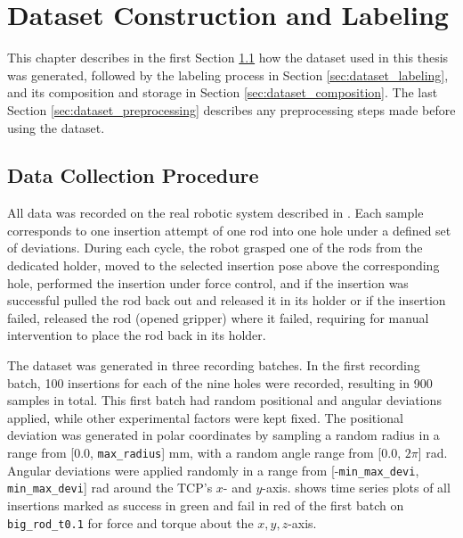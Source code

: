 \chapter{Dataset Construction and Labeling}\label{ch:dataset}

This chapter describes in the first Section \ref{sec:dataset_collection} how the dataset used in this thesis was generated, followed by the labeling process in Section \ref{sec:dataset_labeling}, and its composition and storage in Section \ref{sec:dataset_composition}. The last Section \ref{sec:dataset_preprocessing} describes any preprocessing steps made before using the dataset.

\section{Data Collection Procedure}\label{sec:dataset_collection}

All data was recorded on the real robotic system described in . Each sample corresponds to one insertion attempt of one rod into one hole under a defined set of deviations. During each cycle, the robot grasped one of the rods from the dedicated holder, moved to the selected insertion pose above the corresponding hole, performed the insertion under force control, and if the insertion was successful pulled the rod back out and released it in its holder or if the insertion failed, released the rod (opened gripper) where it failed, requiring for manual intervention to place the rod back in its holder.

The dataset was generated in three recording batches. In the first recording batch, 100 insertions for each of the nine holes were recorded, resulting in 900 samples in total. This first batch had random positional and angular deviations applied, while other experimental factors were kept fixed. The positional deviation was generated in polar coordinates by sampling a random radius in a range from [$0.0$, \texttt{max\_radius}] mm, with a random angle range from [$0.0$, $2\pi$] rad. Angular deviations were applied randomly in a range from [-\texttt{min\_max\_devi}, \texttt{min\_max\_devi}] rad around the TCP's $x$- and $y$-axis.
 shows time series plots of all insertions marked as success in green and fail in red of the first batch on \texttt{big\_rod\_t0.1} for force and torque about the $x,y,z$-axis.

